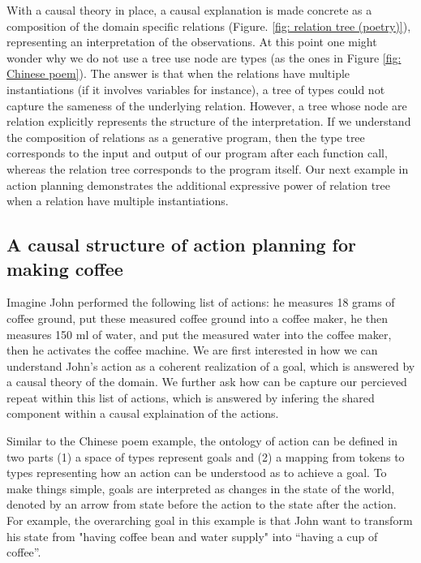With a causal theory in place, a causal explanation is made concrete as a composition of the domain specific relations (Figure. \ref{fig: relation tree (poetry)}), representing an interpretation of the observations. At this point one might wonder why we do not use a tree use node are types (as the ones in Figure \ref{fig: Chinese poem}). The answer is that when the relations have multiple instantiations (if it involves variables for instance), a tree of types could not capture the sameness of the underlying relation. However, a tree whose node are relation explicitly represents the structure of the interpretation. If we understand the composition of relations as a generative program, then the type tree corresponds to the input and output of our program after each function call, whereas the relation tree corresponds to the program itself. Our next example in action planning demonstrates the additional expressive power of relation tree when a relation have multiple instantiations.

\subsection{A causal structure of action planning for making coffee}
Imagine John performed the following list of actions: he measures 18 grams of coffee ground, put these measured coffee ground into a coffee maker, he then measures 150 ml of water, and put the measured water into the coffee maker, then he activates the coffee machine. We are first interested in how we can understand John's action as a coherent realization of a goal, which is answered by a causal theory of the domain. We further ask how can be capture our percieved repeat within this list of actions, which is answered by infering the shared component within a causal explaination of the actions. 

Similar to the Chinese poem example, the ontology of action can be defined in two parts (1) a space of types represent goals and (2) a mapping from tokens to types representing how an action can be understood as to achieve a goal. To make things simple, goals are interpreted as changes in the state of the world, denoted by an arrow from state before the action to the  state after the action. For example, the overarching goal in this example is that John want to transform his state from "having coffee bean and water supply" into ``having a cup of coffee''.


